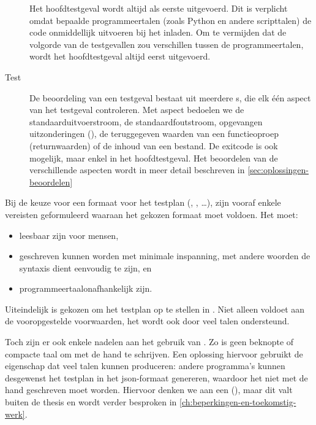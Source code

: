 \begin{description}
\begin{description}
    \end{description}
    Het hoofdtestgeval wordt altijd als eerste uitgevoerd.
    Dit is verplicht omdat bepaalde programmeertalen (zoals Python en andere scripttalen) de code onmiddellijk uitvoeren bij het inladen.
    Om te vermijden dat de volgorde van de testgevallen zou verschillen tussen de programmeertalen, wordt het hoofdtestgeval altijd eerst uitgevoerd.
    \item[Test] De beoordeling van een testgeval bestaat uit meerdere s, die elk één aspect van het testgeval controleren.
    Met aspect bedoelen we de standaarduitvoerstroom, de standaardfoutstroom, opgevangen uitzonderingen (), de teruggegeven waarden van een functieoproep (returnwaarden) of de inhoud van een bestand.
    De exitcode is ook mogelijk, maar enkel in het hoofdtestgeval.
    Het beoordelen van de verschillende aspecten wordt in meer detail beschreven in \cref{sec:oplossingen-beoordelen}
\end{description}

Bij de keuze voor een formaat voor het testplan (, , \ldots), zijn vooraf enkele vereisten geformuleerd waaraan het gekozen formaat moet voldoen.
Het moet:

\begin{itemize}
    \item leesbaar zijn voor mensen,
    \item geschreven kunnen worden met minimale inspanning, met andere woorden de syntaxis dient eenvoudig te zijn, en
    \item programmeertaalonafhankelijk zijn.
\end{itemize}

Uiteindelijk is gekozen om het testplan op te stellen in .
Niet alleen voldoet  aan de vooropgestelde voorwaarden, het wordt ook door veel talen ondersteund.

Toch zijn er ook enkele nadelen aan het gebruik van .
Zo is  geen beknopte of compacte taal om met de hand te schrijven.
Een oplossing hiervoor gebruikt de eigenschap dat veel talen  kunnen produceren: andere programma's kunnen desgewenst het testplan in het json-formaat genereren, waardoor het niet met de hand geschreven moet worden.
Hiervoor denken we aan een  (), maar dit valt buiten de thesis en wordt verder besproken in \cref{ch:beperkingen-en-toekomstig-werk}.


